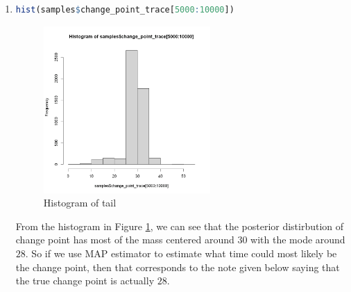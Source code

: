\documentclass{article}
\begin{document}
\begin{enumerate}
\item 
\begin{lstlisting}[language=R]
hist(samples$change_point_trace[5000:10000]) 
\end{lstlisting}
\begin{figure}[H]
\centering
\includegraphics[width=0.6\textwidth]{hist.png}
\caption{Histogram of tail}
\label{fig:hist}
\end{figure}
From the histogram in Figure \ref{fig:hist}, we can see that the posterior distirbution of change point has most of the mass centered around $30$ with the mode around $28$. So if we use MAP estimator to estimate what time could most likely be the change point, then that corresponds to the note given below saying that the true change point is actually $28$.

\end{enumerate}
 
\end{document}
